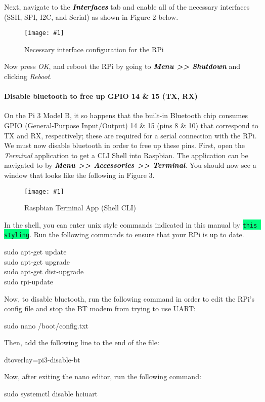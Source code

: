 \documentclass{article}
\newcommand*{\myfont}{\fontfamily{pcr}\selectfont}
\newcommand{\codei}[1]{\colorbox{SpringGreen}{\texttt{#1}}} %
\newcommand{\codeb}[2]{
  \begin{tcolorbox}[width=\textwidth,colback={SpringGreen},title={#1},colbacktitle=darkgreen,coltitle=SpringGreen]
    \myfont
    #2
  \end{tcolorbox}
} %
\newcommand{\outputb}[2]{
  \begin{tcolorbox}[width=\textwidth,colback={light-gray},title={#1},colbacktitle=gray,coltitle=light-gray]
    \myfont
    #2
  \end{tcolorbox}
} %
\newcommand{\loc}[1]{\textit{\textcolor{Black}{\textbf{#1}}}} %
\newcommand{\imagefig}[2]{
    \begin{figure}[H]
        \centering
        \texttt{[image: \#1]}
        \caption{#2}
    \end{figure}
}
\begin{document}
    Next, navigate to the \loc{Interfaces} tab and enable all of the necessary interfaces (SSH, SPI, I2C, and Serial) as shown in Figure 2 below.
    \imagefig{screen2.png}{Necessary interface configuration for the RPi}

    Now press \textit{OK}, and reboot the RPi by going to \loc{Menu >> Shutdown} and clicking \textit{Reboot}.

    \paragraph{Disable bluetooth to free up GPIO 14 \& 15 (TX, RX)}
    On the Pi 3 Model B, it so happens that the built-in Bluetooth chip consumes GPIO (General-Purpose Input/Output) 14 \& 15 (pins 8 \& 10) that correspond to TX and RX, respectively; these are required for a serial connection with the RPi. We must now disable bluetooth in order to free up these pins. First, open the \textit{Terminal} application to get a CLI Shell into Raspbian. The application can be navigated to by \loc{Menu >> Accessories >> Terminal}. You should now see a window that looks like the following in Figure 3.
    \imagefig{screen3.png}{Raspbian Terminal App (Shell CLI)}

    In the shell, you can enter unix style commands indicated in this manual by \codei{this styling}. Run the following commands to ensure that your RPi is up to date.

    \codeb{Update environment}
    {
      sudo apt-get update \\
      sudo apt-get upgrade \\
      sudo apt-get dist-upgrade \\
      sudo rpi-update
    }

    Now, to disable bluetooth, run the following command in order to edit the RPi's config file and stop the BT modem from trying to use UART:

    \codeb{Disable bluetooth: Edit boot config file}
    {
      sudo nano /boot/config.txt
    }

    Then, add the following line to the end of the file:

    \outputb{Disable bluetooth: Text to append to config file}
    {
      dtoverlay=pi3-disable-bt
    }

    Now, after exiting the nano editor, run the following command:

    \codeb{Disable bluetooth: Disable hciuart}
    {
      sudo systemctl disable hciuart
    }
\end{document}
